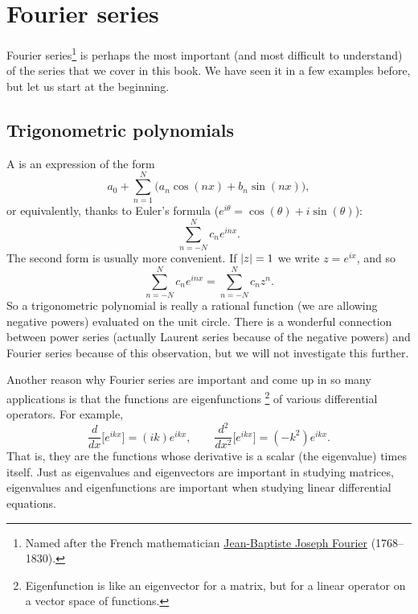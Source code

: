 \sectionnewpage
\section{Fourier series}
\label{sec:fourier}


Fourier series\footnote{%
Named after the French mathematician
\href{https://en.wikipedia.org/wiki/Joseph_Fourier}{Jean-Baptiste Joseph Fourier}
(1768--1830).} is perhaps the most important (and most difficult to
understand) of the series that we cover in
this book.  We have seen it in a few examples before, but let us start
at the beginning.

\subsection{Trigonometric polynomials}

A \emph{} is an expression of the form
\begin{equation*}
a_0 + \sum_{n=1}^N \bigl(a_n \cos(nx) + b_n \sin(nx) \bigr),
\end{equation*}
or equivalently, thanks to Euler's formula ($e^{i\theta} = \cos(\theta) + i
\sin(\theta)$):
\begin{equation*}
\sum_{n=-N}^N c_n e^{inx} .
\end{equation*}
The second form is usually more convenient.  If
$\lvert {z} \rvert=1$ we write $z = e^{ix}$, and so
\begin{equation*}
\sum_{n=-N}^N c_n e^{inx} = 
\sum_{n=-N}^N c_n z^n .
\end{equation*}
So a trigonometric polynomial is really a rational function
(we are allowing negative powers) evaluated on the unit circle.  There is
a wonderful connection between power series (actually Laurent series because
of the negative powers) and
Fourier series because of this observation,
but we will not investigate this further.

\medskip

Another reason why Fourier series are important and come up in so many
applications is that the functions are eigenfunctions%
\footnote{Eigenfunction is like an eigenvector for a matrix, but for a linear
operator on a vector space of functions.} of various
differential operators.  For example,
\begin{equation*}
\frac{d}{dx} \bigl[ e^{ikx} \bigr] = (ik) e^{ikx}, \qquad
\frac{d^2}{dx^2} \bigl[ e^{ikx} \bigr] = (-k^2) e^{ikx} .
\end{equation*}
That is, they are the functions whose derivative is a scalar (the
eigenvalue) times itself.
Just as eigenvalues and eigenvectors are important in studying matrices,
eigenvalues and eigenfunctions are important when studying linear
differential equations.

